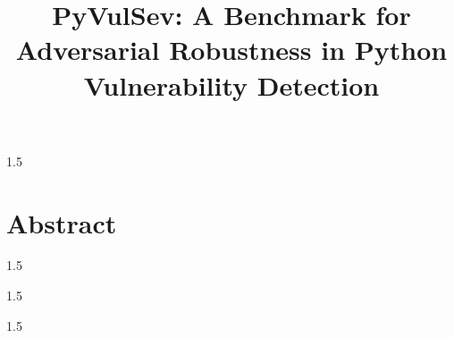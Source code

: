 \documentclass[12pt,oneside,a4paper]{book} %
\title{PyVulSev: A Benchmark for Adversarial Robustness in Python Vulnerability Detection}
\begin{document}
	\NoBgThispage%
	\maketitle
	\newpage
	\ifDrf
	\else
	\begin{spacing}{1.5}
		
		
		\newpage
		
		
		\newpage
		
		
		\newpage
		
		\chapter*{Abstract}
		

		\newpage
		
		
	\end{spacing}
	\newpage
	\pagestyle{fplain}
	\begin{spacing}{1.5}
		\tableofcontents	
	\end{spacing}
	\newpage
	\begin{spacing}{1.5}
		\cleardoublepage
		\listoffigures	
	\end{spacing}
	\newpage
	\begin{spacing}{1.5}
		\cleardoublepage
		\listoftables	
	\end{spacing}

	\glsaddall

	\printglossary[type=\acronymtype, title= Abbreviations, toctitle=Abbreviations]
\end{document}
